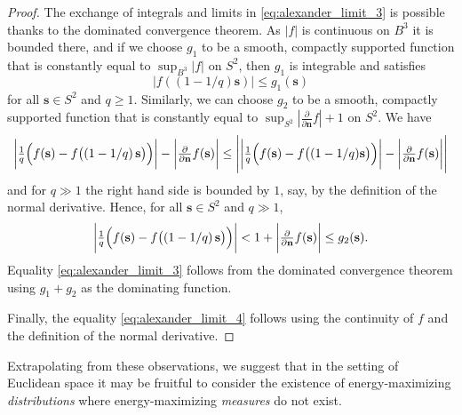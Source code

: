 \documentclass[a4paper, oneside, reqno]{amsart}
\theoremstyle{definition}
\theoremstyle{remark}
\numberwithin{equation}{section}
\renewcommand{\vec}{\mathbf}
\begin{document}
\begin{proof}
The exchange of integrals and limits in \eqref{eq:alexander_limit_3} is possible thanks to the dominated convergence theorem. As \(|f|\) is continuous on \(B^3\) it is bounded there, and if we choose \(g_1\) to be a smooth, compactly supported function that is constantly equal to \(\sup_{B^3}|f|\) on \(S^2\), then \(g_1\) is integrable and satisfies 
\[\bigl|f((1-1/q) \vec{s})\bigr| \leq g_1(\vec{s})\]
for all \(\vec{s} \in S^2\) and \(q 
\geq 1\). Similarly, we can choose \(g_2\) to be a smooth, compactly supported function that is constantly equal to \(\sup_{S^2} \left| \tfrac{\partial}{\partial \vec{n}} f \right| + 1\) on \(S^2\). We have 
\[
    \biggl|  
        \tfrac{1}{q} 
        \Bigl(
            f(\vec{s}) - f\bigl(\left(1 - 1/q \right)\vec{s}\bigr) 
        \Bigr)
    \biggr| 
    - 
    \biggl| 
        \tfrac{\partial}{\partial \vec{n}} f(\vec{s}) 
    \biggr| 
    \leq 
    \Biggl| 
        \biggl|  
            \tfrac{1}{q} 
            \Bigl(
                f(\vec{s}) - 
                f\bigl(
                    (1-1/q)\vec{s}
                \bigr) 
            \Bigr)
        \biggr| 
        - 
        \biggl| 
            \tfrac{\partial}{\partial \vec{n}} f(\vec{s}) 
        \biggr| 
    \Biggr| 
\]
and for \(q \gg 1\) the right hand side is bounded by \(1\), say, by the definition of the normal derivative.  Hence, for all \(\vec{s} \in S^2\) and \(q \gg 1\),
\[
    \biggl|  
        \tfrac{1}{q} 
        \Bigl(
            f(\vec{s}) - f\bigl(\left(1 - 1/q \right)\vec{s}\bigr) 
        \Bigr)
    \biggr| 
    < 
    1
    +
    \biggl| 
        \tfrac{\partial}{\partial \vec{n}} f(\vec{s}) 
    \biggr| 
    \leq 
    g_2(\vec{s})
    .
\]
Equality \eqref{eq:alexander_limit_3} follows from the dominated convergence theorem using \(g_1 + g_2\) as the dominating function.

Finally, the equality \eqref{eq:alexander_limit_4} follows using the continuity of \(f\) and the definition of the normal derivative.
\end{proof}

Extrapolating from these observations, we suggest that in the setting of Euclidean space it may be fruitful to consider the existence of energy-maximizing \emph{distributions} where energy-maximizing \emph{measures} do not exist.




\end{document}
